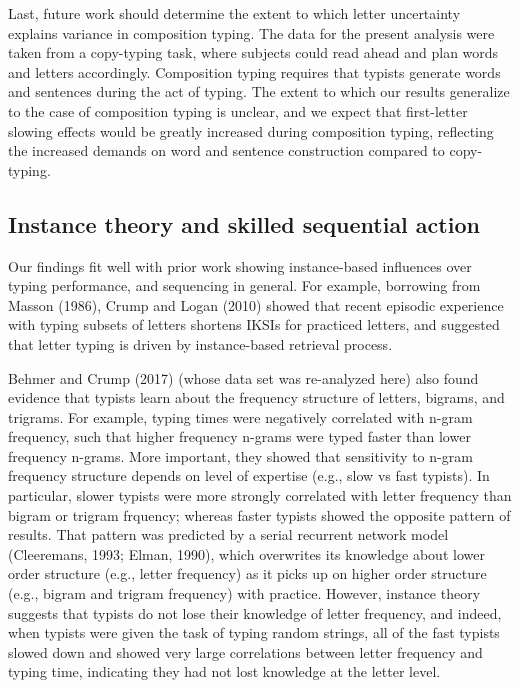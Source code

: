 \documentclass[,man,floatsintext]{apa6}
\begin{document}
Last, future work should determine the extent to which letter uncertainty explains variance in composition typing. The data for the present analysis were taken from a copy-typing task, where subjects could read ahead and plan words and letters accordingly. Composition typing requires that typists generate words and sentences during the act of typing. The extent to which our results generalize to the case of composition typing is unclear, and we expect that first-letter slowing effects would be greatly increased during composition typing, reflecting the increased demands on word and sentence construction compared to copy-typing.

\hypertarget{instance-theory-and-skilled-sequential-action}{%
\subsection{Instance theory and skilled sequential action}\label{instance-theory-and-skilled-sequential-action}}

Our findings fit well with prior work showing instance-based influences over typing performance, and sequencing in general. For example, borrowing from Masson (1986), Crump and Logan (2010) showed that recent episodic experience with typing subsets of letters shortens IKSIs for practiced letters, and suggested that letter typing is driven by instance-based retrieval process.

Behmer and Crump (2017) (whose data set was re-analyzed here) also found evidence that typists learn about the frequency structure of letters, bigrams, and trigrams. For example, typing times were negatively correlated with n-gram frequency, such that higher frequency n-grams were typed faster than lower frequency n-grams. More important, they showed that sensitivity to n-gram frequency structure depends on level of expertise (e.g., slow vs fast typists). In particular, slower typists were more strongly correlated with letter frequency than bigram or trigram frquency; whereas faster typists showed the opposite pattern of results. That pattern was predicted by a serial recurrent network model (Cleeremans, 1993; Elman, 1990), which overwrites its knowledge about lower order structure (e.g., letter frequency) as it picks up on higher order structure (e.g., bigram and trigram frequency) with practice. However, instance theory suggests that typists do not lose their knowledge of letter frequency, and indeed, when typists were given the task of typing random strings, all of the fast typists slowed down and showed very large correlations between letter frequency and typing time, indicating they had not lost knowledge at the letter level.
\end{document}

